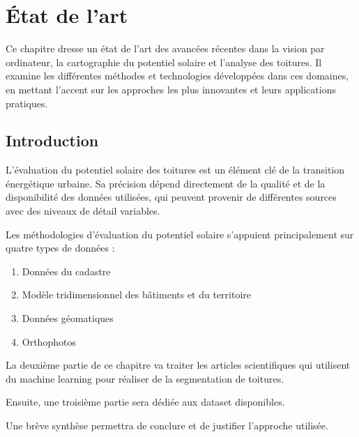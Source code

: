 
\chapter{État de l'art}
\label{chap:analysis}

Ce chapitre dresse un état de l'art des avancées récentes dans la vision par ordinateur, la cartographie du potentiel solaire et l'analyse des toitures. Il examine les différentes méthodes et technologies développées dans ces domaines, en mettant l'accent sur les approches les plus innovantes et leurs applications pratiques.

\localtableofcontents

\newpage

\section{Introduction}
\par{L'évaluation du potentiel solaire des toitures est un élément clé de la transition énergétique urbaine. Sa précision dépend directement de la qualité et de la disponibilité des données utilisées, qui peuvent provenir de différentes sources avec des niveaux de détail variables.}

\par{Les méthodologies d'évaluation du potentiel solaire s'appuient principalement sur quatre types de données :}
\begin{enumerate}
    \item Données du cadastre
    \item Modèle tridimensionnel des bâtiments et du territoire
    \item Données géomatiques
    \item Orthophotos
\end{enumerate}

\par{La deuxième partie de ce chapitre va traiter les articles scientifiques qui utilisent du machine learning pour réaliser de la segmentation de toitures.}

\par{Ensuite, une troisième partie sera dédiée aux dataset disponibles.}

\par{Une brève synthèse permettra de conclure et de justifier l'approche utilisée.}

